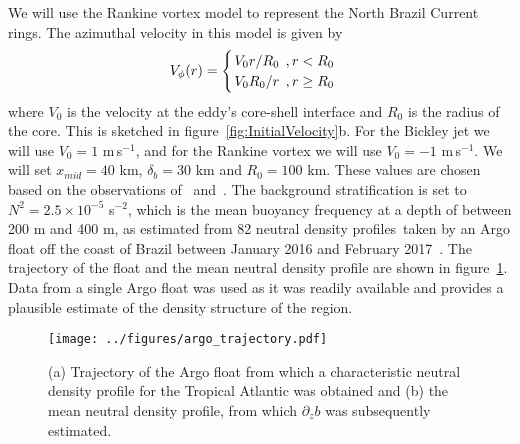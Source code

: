We will use the Rankine vortex model to represent the North Brazil Current rings. The azimuthal velocity in this model is given by
\begin{equation}
    V_{\phi}(r) = 
    \begin{cases}
        \flatfrac{V_0 r}{R_0} \, , r < R_0 \\
        \flatfrac{V_0 R_0}{r} \, , r \geq R_0
    \end{cases}
\end{equation}
where $V_0$ is the velocity at the eddy's core-shell interface and $R_0$ is the radius of the core. This is sketched in figure~\ref{fig:InitialVelocity}b. For the Bickley jet we will use $V_0 = 1$ m$\,$s$^{-1}$, and for the Rankine vortex we will use $V_0 = - 1$ m$\,$s$^{-1}$. We will set $x_{mid} = 40$ km, $\delta_b = 30$ km and $R_0 = 100$ km. These values are chosen based on the observations of~\citet{Johns1998} and~\citet{Castelao2011}. The background stratification is set to $N^2 = 2.5 \times 10^{-5}$ s$^{-2}$, which is the mean buoyancy frequency at a depth of between 200 m and 400 m, as estimated from 82 neutral density profiles\footnotemark\ taken by an Argo float off the coast of Brazil between January 2016 and February 2017~\citep{Argo2022}.
The trajectory of the float and the mean neutral density profile are shown in figure~\ref{fig:InitialStratification}. Data from a single Argo float was used as it was readily available and provides a plausible estimate of the density structure of the region.

\begin{figure}[t]
    \centering
    \texttt{[image: ../figures/argo\_trajectory.pdf]}
    \caption{(a) Trajectory of the Argo float from which a characteristic neutral density profile for the Tropical Atlantic was obtained and (b) the mean neutral density profile, from which $\partial_z b$ was subsequently estimated.}
    \label{fig:InitialStratification}
\end{figure}

